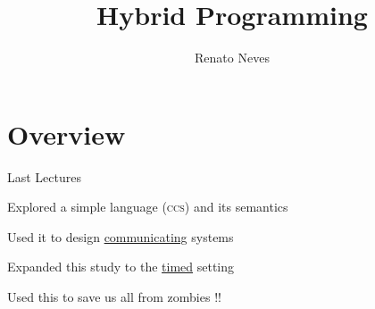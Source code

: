 \documentclass{beamer}
\author[Renato Neves]{Renato Neves}
\date{}
\begin{document}
\title{Hybrid Programming}

\frame[plain]{\titlepage}

\section{Overview}

\begin{frame}{Last Lectures}
       
       Explored a simple language (\textsc{ccs}) and its semantics

       Used it to design \alert{\underline{communicating}} systems

       Expanded this study to the \alert{\underline{timed}} setting
       
       Used this to save us all from zombies !!

\end{frame}
\end{document}
